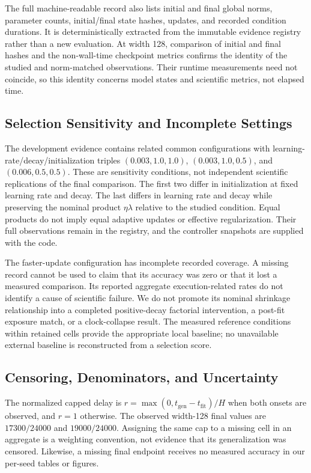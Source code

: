 \documentclass{article}
\newcommand{\fit}{t_{\mathrm{fit}}}
\newcommand{\gen}{t_{\mathrm{gen}}}
\begin{document}
The full machine-readable record  also lists initial and final global norms, parameter counts, initial/final state hashes, updates, and recorded condition durations. It is deterministically extracted from the immutable evidence registry rather than a new evaluation. At width 128, comparison of initial and final hashes and the non-wall-time checkpoint metrics confirms the identity of the studied and norm-matched observations. Their runtime measurements need not coincide, so this identity concerns model states and scientific metrics, not elapsed time.

\subsection{Selection Sensitivity and Incomplete Settings}
The development evidence contains related common configurations with learning-rate/decay/initialization triples $(0.003,1.0,1.0)$, $(0.003,1.0,0.5)$, and $(0.006,0.5,0.5)$. These are sensitivity conditions, not independent scientific replications of the final comparison. The first two differ in initialization at fixed learning rate and decay. The last differs in learning rate and decay while preserving the nominal product $\eta\lambda$ relative to the studied condition. Equal products do not imply equal adaptive updates or effective regularization. Their full observations remain in the registry, and the controller snapshots are supplied with the code.

The faster-update configuration has incomplete recorded coverage. A missing record cannot be used to claim that its accuracy was zero or that it lost a measured comparison. Its reported aggregate execution-related rates do not identify a cause of scientific failure. We do not promote its nominal shrinkage relationship into a completed positive-decay factorial intervention, a post-fit exposure match, or a clock-collapse result. The measured reference conditions within retained cells provide the appropriate local baseline; no unavailable external baseline is reconstructed from a selection score.

\subsection{Censoring, Denominators, and Uncertainty}
The normalized capped delay is $r=\max(0,\gen-\fit)/H$ when both onsets are observed, and $r=1$ otherwise. The observed width-128 final values are $17300/24000$ and $19000/24000$. Assigning the same cap to a missing cell in an aggregate is a weighting convention, not evidence that its generalization was censored. Likewise, a missing final endpoint receives no measured accuracy in our per-seed tables or figures.
\end{document}
